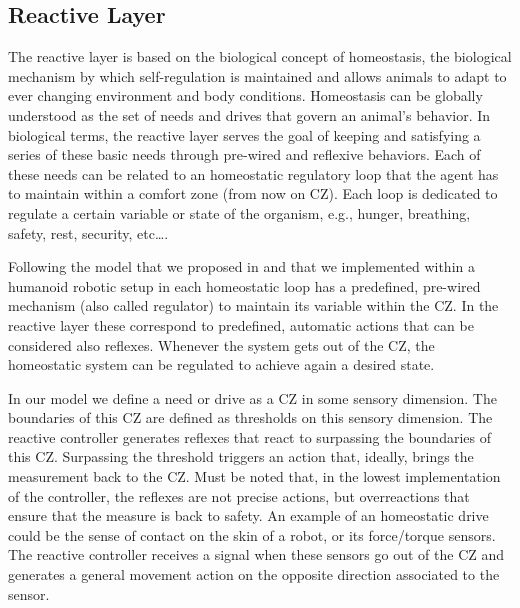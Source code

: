 \documentclass[letterpaper, 10 pt, conference]{ieeeconf}  %
\begin{document}
\subsection{Reactive Layer}
\label{sec:reactive_bio}

The reactive layer is based on the biological concept of homeostasis, the biological mechanism by which self-regulation is maintained and allows animals to adapt to ever changing environment and body conditions. Homeostasis can be globally understood as the set of needs and drives that govern an animal's behavior. In biological terms, the reactive layer serves the goal of keeping and satisfying a series of these basic needs through pre-wired and reflexive behaviors. Each of these needs can be related to an homeostatic regulatory loop that the agent has to maintain within a comfort zone (from now on CZ). Each loop is dedicated to regulate a certain variable or state of the organism, e.g., hunger, breathing, safety, rest, security, etc\ldots. 

Following the model that we proposed in \cite{sanchez2010allostatic} and that we implemented within a humanoid robotic setup in \cite{vouloutsi2013modulating} each homeostatic loop has a predefined, pre-wired mechanism (also called regulator) to maintain its variable within the CZ. 
In the reactive layer these correspond to predefined, automatic actions that can be considered also reflexes. Whenever the system gets out of the CZ, the homeostatic system can be regulated to achieve again a desired state. 

In our model we define a need or drive as a CZ in some sensory dimension. The boundaries of this CZ are defined as thresholds on this sensory dimension. The reactive controller generates reflexes that react to surpassing the boundaries of this CZ.  Surpassing the threshold triggers an action that, ideally, brings the measurement back to the CZ. Must be noted that, in the lowest implementation of the controller, the reflexes are not precise actions, but overreactions that ensure that the measure is back to safety. An example of an homeostatic drive could be the sense of contact on the skin of a robot, or its force/torque sensors. The reactive controller receives a signal when these sensors go out of the CZ and generates a general movement action on the opposite direction associated to the sensor. 

\end{document}
